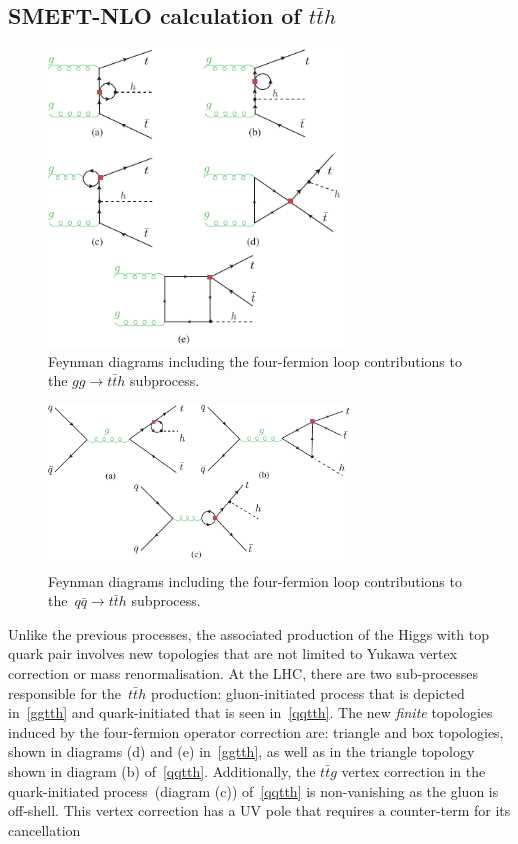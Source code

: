 	\subsection{SMEFT-NLO calculation of  $t\bar th$}
	\begin{figure}[h!]
		\centering
		\includegraphics[width=8cm]{./fig/ggttH-4F_NLO}
		\caption{Feynman diagrams including the four-fermion loop contributions to the $ gg \to t\bar{t} h$ subprocess.}
		\label{ggtth}
	\end{figure}
	\begin{figure}[hth]
		\centering
		\includegraphics[width=8cm]{./fig/qqttH-4F_NLO}
		\caption{Feynman diagrams including the four-fermion loop contributions to the~$ q \bar{q} \to t\bar{t} h$ subprocess.}
		\label{qqtth}
	\end{figure}
	\par Unlike the previous processes, the associated production of the Higgs with top quark pair involves new topologies that are not limited to Yukawa vertex correction or mass renormalisation.  At the LHC, there are two sub-processes responsible for the~$t\bar t h$ production: gluon-initiated process that is depicted in~\autoref{ggtth} and quark-initiated that is seen  in~\autoref{qqtth}. The new \emph{finite} topologies induced by the four-fermion operator correction are: triangle and box topologies, shown in diagrams (d) and (e) in~\autoref{ggtth}, as well as in the triangle topology shown in diagram (b)  of~\autoref{qqtth}.  Additionally, the $t\bar t g$ vertex correction in the quark-initiated process~(diagram (c)) of~\autoref{qqtth} is non-vanishing as the gluon is off-shell. This vertex correction has a UV pole that requires a counter-term for its cancellation

